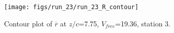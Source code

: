 \begin{figure}[H]
\centering
\texttt{[image: figs/run\_23/run\_23\_R\_contour]}
\caption{Contour plot of $\overline{r}$ at $z/c$=7.75, $V_{free}$=19.36, station 3.}
\label{fig:run_23_R_contour}
\end{figure}


